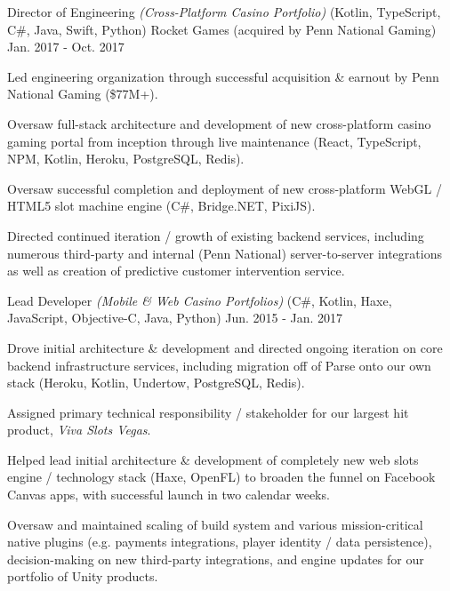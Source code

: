 \begin{cventries}
  \cventry
    {{\color{awesome}Director of Engineering} \textit{(Cross-Platform Casino Portfolio)} (Kotlin, TypeScript, C\#, Java, Swift, Python)} %
    {Rocket Games {\color{awesome}(acquired by Penn National Gaming)}} %
    {} %
    {Jan. 2017 - Oct. 2017} %
    { %
      \begin{cvitems}
        \item {Led engineering organization through successful acquisition \& earnout by Penn National Gaming (\$77M+).}
        \item {Oversaw full-stack architecture and development of new cross-platform casino gaming portal from inception through live maintenance (React, TypeScript, NPM, Kotlin, Heroku, PostgreSQL, Redis).}
        \item {Oversaw successful completion and deployment of new cross-platform WebGL / HTML5 slot machine engine (C\#, Bridge.NET, PixiJS).}
        \item {Directed continued iteration / growth of existing backend services, including numerous third-party and internal (Penn National) server-to-server integrations as well as creation of predictive customer intervention service.}
      \end{cvitems}
    }


  \cventry
    {{\color{awesome}Lead Developer} \textit{(Mobile \& Web Casino Portfolios)} (C\#, Kotlin, Haxe, JavaScript, Objective-C, Java, Python)} %
    {} %
    {} %
    {Jun. 2015 - Jan. 2017} %
    { %
      \begin{cvitems}
        \item {Drove initial architecture \& development and directed ongoing iteration on core backend infrastructure services, including migration off of Parse onto our own stack (Heroku, Kotlin, Undertow, PostgreSQL, Redis).}
        \item {Assigned primary technical responsibility / stakeholder for our largest hit product, \textit{Viva Slots Vegas}.}
        \item {Helped lead initial architecture \& development of completely new web slots engine / technology stack (Haxe, OpenFL) to broaden the funnel on Facebook Canvas apps, with successful launch in two calendar weeks.}
        \item {Oversaw and maintained scaling of build system and various mission-critical native plugins (e.g. payments integrations, player identity / data persistence), decision-making on new third-party integrations, and engine updates for our portfolio of Unity products.}
      \end{cvitems}
    }


\end{cventries}
